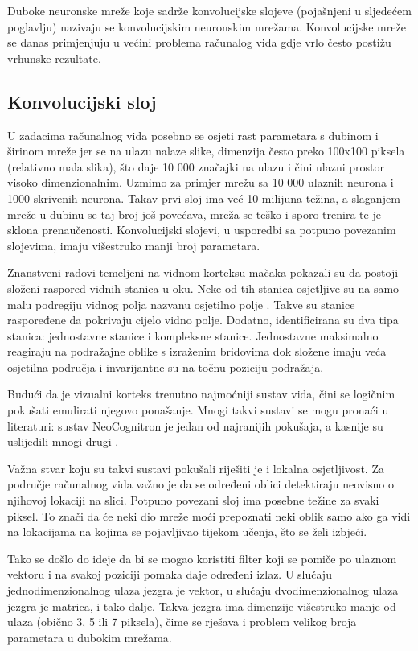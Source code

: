 \documentclass[times, utf8, diplomski, numeric]{fer}
\begin{document}
Duboke neuronske mreže koje sadrže konvolucijske slojeve (pojašnjeni u sljedećem poglavlju) nazivaju se konvolucijskim neuronskim mrežama. Konvolucijske mreže se danas primjenjuju u većini problema računalog vida gdje vrlo često postižu vrhunske rezultate.

\subsection{Konvolucijski sloj}

U zadacima računalnog vida posebno se osjeti rast parametara s dubinom i širinom mreže jer se na ulazu nalaze slike, dimenzija često preko 100x100 piksela (relativno mala slika), što daje 10 000 značajki na ulazu i čini ulazni prostor visoko dimenzionalnim. Uzmimo za primjer mrežu sa 10 000 ulaznih neurona i 1000 skrivenih neurona. Takav prvi sloj ima već 10 milijuna težina, a slaganjem mreže u dubinu se taj broj još povećava, mreža se teško i sporo trenira te je sklona prenaučenosti. Konvolucijski slojevi, u usporedbi sa potpuno povezanim slojevima, imaju višestruko manji broj parametara.

Znanstveni radovi temeljeni na vidnom korteksu  mačaka pokazali su da postoji složeni raspored vidnih stanica u oku. Neke od tih stanica osjetljive su na samo malu podregiju vidnog polja nazvanu osjetilno polje . Takve su stanice raspoređene da pokrivaju cijelo vidno polje. Dodatno, identificirana su dva tipa stanica: jednostavne stanice i kompleksne stanice. Jednostavne maksimalno reagiraju na podražajne oblike s izraženim bridovima dok složene imaju veća osjetilna područja i invarijantne su na točnu poziciju podražaja.

Budući da je vizualni korteks trenutno najmoćniji sustav vida, čini se logičnim pokušati emulirati njegovo ponašanje. Mnogi takvi sustavi se mogu pronaći u literaturi: sustav NeoCognitron \cite{neocognitron} je jedan od najranijih pokušaja, a kasnije su uslijedili mnogi drugi \cite{cortex_mehachanism} \cite{gradient_document}.

Važna stvar koju su takvi sustavi pokušali riješiti je i lokalna osjetljivost.
Za područje računalnog vida važno je da se određeni oblici detektiraju neovisno o njihovoj lokaciji na slici. Potpuno povezani sloj ima posebne težine za svaki piksel. To znači da će neki dio mreže moći prepoznati neki oblik samo ako ga vidi na lokacijama na kojima se pojavljivao tijekom učenja, što se želi izbjeći.

Tako se došlo do ideje da bi se mogao koristiti filter koji se pomiče po ulaznom vektoru i na svakoj poziciji pomaka daje određeni izlaz. U slučaju jednodimenzionalnog ulaza jezgra je vektor, u slučaju dvodimenzionalnog ulaza jezgra je matrica, i tako dalje. Takva jezgra ima dimenzije višestruko manje od ulaza (obično 3, 5 ili 7 piksela), čime se rješava i problem velikog broja parametara u dubokim mrežama.
\end{document}
